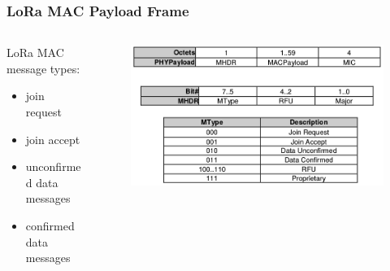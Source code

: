 \begin{frame}[fragile]
  \frametitle{LoRa MAC Payload Frame}
  \begin{columns}
    \begin{column}{.48\linewidth}
    LoRa MAC message types:
       \begin{itemize}
        \item join request
        \item join accept 
        \item unconfirmed data messages
        \item confirmed data messages
       \end{itemize}
  \end{column}
   \begin{column}{.48\linewidth}
 \begin{figure}
  \centering
  \includegraphics[width=\textwidth]{img/mac_frame.png}
  \end{figure}
  \end{column}
  \end{columns}
\end{frame}

